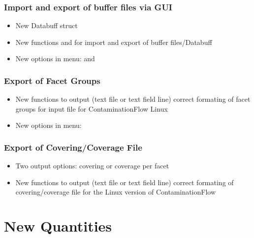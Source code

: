 \subsubsection{Import and export of buffer files via GUI}
\begin{itemize}[noitemsep,topsep=0pt]
\item New Databuff struct 
\item New functions  and  for import and export of buffer files/Databuff
\item New options in  menu:  and 
\end{itemize}

\subsubsection{Export of Facet Groups}
\begin{itemize}[noitemsep,topsep=0pt]
\item New functions to output (text file or text field line) correct formating of facet groups for input file for ContaminationFlow Linux
\item New options in  menu: 
\end{itemize}

\subsubsection{Export of Covering/Coverage File}
\begin{itemize}[noitemsep,topsep=0pt]
\item Two output options: covering or coverage per facet
\item New functions to output (text file or text field line) correct formating of covering/coverage file for the Linux version of ContaminationFlow
\end{itemize}


\section{New Quantities}
